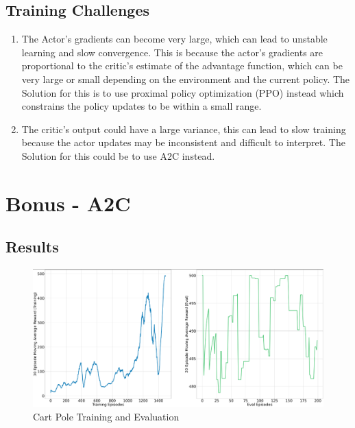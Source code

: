\documentclass{article} %
\begin{document}
\subsection{Training Challenges}

\begin{enumerate}
\item The Actor's gradients can become very large, which can lead to unstable learning and slow convergence. This is because the actor's gradients are proportional to the critic's estimate of the advantage function, which can be very large or small depending on the environment and the current policy. The Solution for this is to use proximal policy optimization (PPO) instead which constrains the policy updates to be within a small range.
\item The critic's output could have a large variance, this can lead to slow training because the actor updates may be inconsistent and difficult to interpret. The Solution for this could be to use A2C instead.
\end{enumerate}
\section{Bonus - A2C}
\subsection{Results}
\begin{figure}[H]
    \begin{center}
        \includegraphics[width=\textwidth]{a2c_cartpole.png}
    \end{center}
    \caption{Cart Pole Training and Evaluation}
\end{figure}
\end{document}
